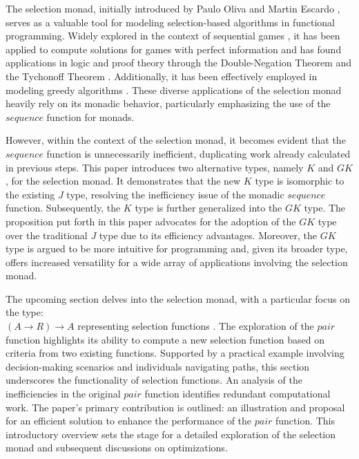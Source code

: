 \documentclass[runningheads]{llncs}
\begin{document}
The selection monad, initially introduced by Paulo Oliva and Martin
Escardo \cite{escardo2010selection}, serves as a valuable tool for
modeling selection-based algorithms in functional programming. Widely
explored in the context of sequential games
\cite{escardo2010sequential}, it has been applied to compute solutions
for games with perfect information and has found applications in logic
and proof theory through the Double-Negation Theorem and the Tychonoff
Theorem \cite{escardo2010sequential}. Additionally, it has been
effectively employed in modeling greedy algorithms
\cite{hartmann2021greedyselection}. These diverse applications of the
selection monad heavily rely on its monadic behavior, particularly
emphasizing the use of the \(sequence\) function for monads.

However, within the context of the selection monad, it becomes evident
that the \(sequence\) function is unnecessarily inefficient, duplicating
work already calculated in previous steps. This paper introduces two
alternative types, namely \(K\) and \(GK\), for the selection monad. It
demonstrates that the new \(K\) type is isomorphic to the existing \(J\)
type, resolving the inefficiency issue of the monadic \(sequence\)
function. Subsequently, the \(K\) type is further generalized into the
\(GK\) type. The proposition put forth in this paper advocates for the
adoption of the \(GK\) type over the traditional \(J\) type due to its
efficiency advantages. Moreover, the \(GK\) type is argued to be more
intuitive for programming and, given its broader type, offers increased
versatility for a wide array of applications involving the selection
monad.

The upcoming section delves into the selection monad, with a particular
focus on the type:\\
\((A \rightarrow R) \rightarrow A\) representing selection functions
\cite{escardo2010selection}. The exploration of the \(pair\) function
highlights its ability to compute a new selection function based on
criteria from two existing functions. Supported by a practical example
involving decision-making scenarios and individuals navigating paths,
this section underscores the functionality of selection functions. An
analysis of the inefficiencies in the original \(pair\) function
identifies redundant computational work. The paper's primary
contribution is outlined: an illustration and proposal for an efficient
solution to enhance the performance of the \(pair\) function. This
introductory overview sets the stage for a detailed exploration of the
selection monad and subsequent discussions on optimizations.
\end{document}
